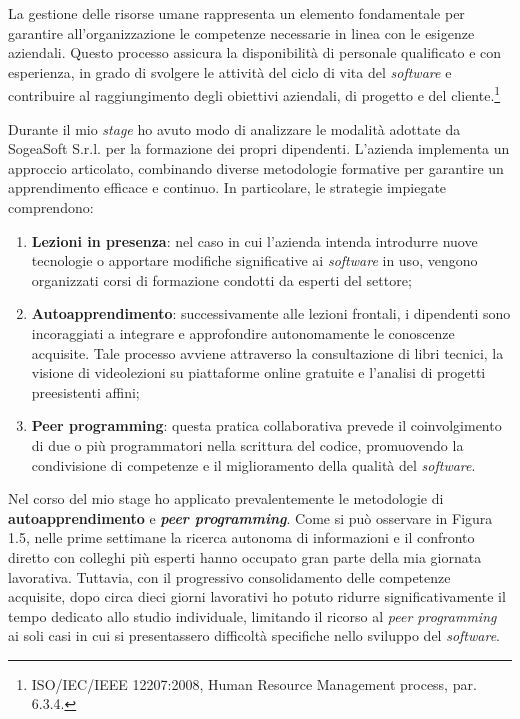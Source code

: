         La gestione delle risorse umane rappresenta un elemento fondamentale per garantire all'organizzazione le competenze necessarie in linea con le esigenze aziendali. Questo processo assicura la disponibilità di personale qualificato e con esperienza, in grado di svolgere le attività del ciclo di vita del \textit{software} e contribuire al raggiungimento degli obiettivi aziendali, di progetto e del cliente.\footnote{ISO/IEC/IEEE 12207:2008, Human Resource Management process, par. 6.3.4.}

        \vspace{0.2 em}
        \noindent Durante il mio \textit{stage} ho avuto modo di analizzare le modalità adottate da SogeaSoft S.r.l. per la formazione dei propri dipendenti. L'azienda implementa un approccio articolato, combinando diverse metodologie formative per garantire un apprendimento efficace e continuo. In particolare, le strategie impiegate comprendono:

        \begin{enumerate}
        \item \textbf{Lezioni in presenza}: nel caso in cui l’azienda intenda introdurre nuove tecnologie o apportare modifiche significative ai \textit{software} in uso, vengono organizzati corsi di formazione condotti da esperti del settore;

        \item \textbf{Autoapprendimento}: successivamente alle lezioni frontali, i dipendenti sono incoraggiati a integrare e approfondire autonomamente le conoscenze acquisite. Tale processo avviene attraverso la consultazione di libri tecnici, la visione di videolezioni su piattaforme online gratuite e l’analisi di progetti preesistenti affini;

        \item \textbf{Peer programming}: questa pratica collaborativa prevede il coinvolgimento di due o più programmatori nella scrittura del codice, promuovendo la condivisione di competenze e il miglioramento della qualità del \textit{software}.
        \end{enumerate}
        
        \noindent Nel corso del mio stage ho applicato prevalentemente le metodologie di \textbf{autoapprendimento} e \textit{\textbf{peer programming}}. Come si può osservare in Figura 1.5, nelle prime settimane la ricerca autonoma di informazioni e il confronto diretto con colleghi più esperti hanno occupato gran parte della mia giornata lavorativa. Tuttavia, con il progressivo consolidamento delle competenze acquisite, dopo circa dieci giorni lavorativi ho potuto ridurre significativamente il tempo dedicato allo studio individuale,  limitando il ricorso al \textit{peer programming} ai soli casi in cui si presentassero difficoltà specifiche nello sviluppo del \textit{software}.

